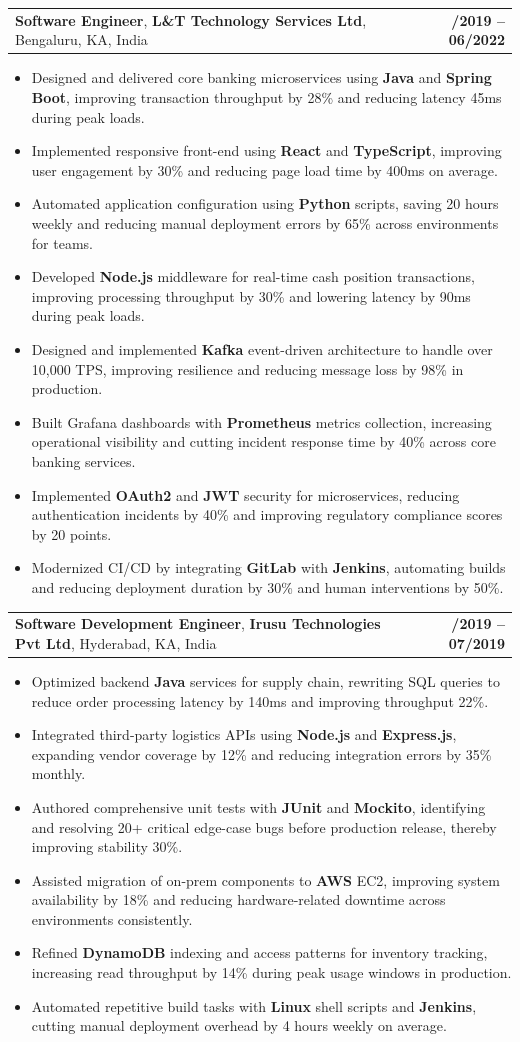 \documentclass[letterpaper,11pt]{article}
\makeatletter
\newcommand{\resumeItem}[1]{
  \item\footnotesize{
    {#1 \vspace{-2pt}}
  }
}
\newcommand{\resumeSubheading}[4]{
  \vspace{-2pt}\item
    \begin{tabular*}{1.0\textwidth}[t]{l@{\extracolsep{\fill}}r}
      \textbf{\fontsize{10pt}{14pt}\selectfont #3}, \textbf{\fontsize{10pt}{14pt}\selectfont #1}, \fontsize{10pt}{14pt}\selectfont #4 & \textbf{\fontsize{10pt}{14pt}\selectfont #2} \\
    \end{tabular*}\vspace{-7pt}
}
\newcommand{\resumeItemListStart}{\begin{itemize}[leftmargin=*]}
\newcommand{\resumeItemListEnd}{\end{itemize}\vspace{-5pt}}
\makeatother
\begin{document}
    \resumeSubheading
        {L\&T Technology Services Ltd}{08/2019 -- 06/2022}
        {Software Engineer}{Bengaluru, KA, India}
      \resumeItemListStart
        \resumeItem{Designed and delivered core banking microservices using \textbf{Java} and \textbf{Spring Boot}, improving transaction throughput by 28\% and reducing latency 45ms during peak loads.}
        \resumeItem{Implemented responsive front-end using \textbf{React} and \textbf{TypeScript}, improving user engagement by 30\% and reducing page load time by 400ms on average.}
        \resumeItem{Automated application configuration using \textbf{Python} scripts, saving 20 hours weekly and reducing manual deployment errors by 65\% across environments for teams.}
        \resumeItem{Developed \textbf{Node.js} middleware for real-time cash position transactions, improving processing throughput by 30\% and lowering latency by 90ms during peak loads.}
        \resumeItem{Designed and implemented \textbf{Kafka} event-driven architecture to handle over 10,000 TPS, improving resilience and reducing message loss by 98\% in production.}
        \resumeItem{Built Grafana dashboards with \textbf{Prometheus} metrics collection, increasing operational visibility and cutting incident response time by 40\% across core banking services.}
        \resumeItem{Implemented \textbf{OAuth2} and \textbf{JWT} security for microservices, reducing authentication incidents by 40\% and improving regulatory compliance scores by 20 points.}
        \resumeItem{Modernized CI/CD by integrating \textbf{GitLab} with \textbf{Jenkins}, automating builds and reducing deployment duration by 30\% and human interventions by 50\%.}
      \resumeItemListEnd

    \resumeSubheading
        {Irusu Technologies Pvt Ltd}{01/2019 -- 07/2019}
        {Software Development Engineer}{Hyderabad, KA, India}
\resumeItemListStart
    \resumeItem{Optimized backend \textbf{Java} services for supply chain, rewriting SQL queries to reduce order processing latency by 140ms and improving throughput 22\%.}
    \resumeItem{Integrated third-party logistics APIs using \textbf{Node.js} and \textbf{Express.js}, expanding vendor coverage by 12\% and reducing integration errors by 35\% monthly.}
    \resumeItem{Authored comprehensive unit tests with \textbf{JUnit} and \textbf{Mockito}, identifying and resolving 20+ critical edge-case bugs before production release, thereby improving stability 30\%.}
    \resumeItem{Assisted migration of on-prem components to \textbf{AWS} EC2, improving system availability by 18\% and reducing hardware-related downtime across environments consistently.}
    \resumeItem{Refined \textbf{DynamoDB} indexing and access patterns for inventory tracking, increasing read throughput by 14\% during peak usage windows in production.}
    \resumeItem{Automated repetitive build tasks with \textbf{Linux} shell scripts and \textbf{Jenkins}, cutting manual deployment overhead by 4 hours weekly on average.}
\resumeItemListEnd
\end{document}
